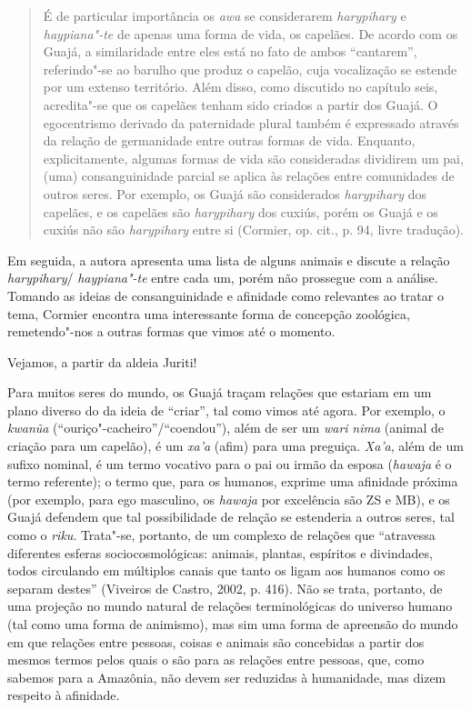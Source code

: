 \begin{quote}
É de particular importância os \emph{awa} se considerarem
\emph{harypihary} e \emph{haypiana"-te} de apenas uma forma de vida, os
capelães. De acordo com os Guajá, a similaridade entre eles está no fato
de ambos ``cantarem'', referindo"-se ao barulho que produz o capelão, cuja
vocalização se estende por um extenso território. Além disso, como
discutido no capítulo seis, acredita"-se que os capelães tenham sido
criados a partir dos Guajá. O egocentrismo derivado da paternidade
plural também é expressado através da relação de germanidade entre
outras formas de vida. Enquanto, explicitamente, algumas formas de vida
são consideradas dividirem um pai, (uma) consanguinidade parcial se
aplica às relações entre comunidades de outros seres. Por exemplo, os
Guajá são considerados \emph{harypihary} dos capelães, e os capelães são
\emph{harypihary} dos cuxiús, porém os Guajá e os cuxiús não são
\emph{harypihary} entre si (Cormier, op. cit., p. 94, livre tradução).
\end{quote}

Em seguida, a autora apresenta uma lista de alguns animais e discute a
relação \emph{harypihary}/ \emph{haypiana"-te} entre cada um, porém não
prossegue com a análise. Tomando as ideias de consanguinidade e
afinidade como relevantes ao tratar o tema, Cormier encontra uma
interessante forma de concepção zoológica, remetendo"-nos a outras formas
que vimos até o momento.

Vejamos, a partir da aldeia Juriti!

Para muitos seres do mundo, os Guajá traçam relações que estariam em um
plano diverso do da ideia de ``criar'', tal como vimos até agora. Por
exemplo, o \emph{kwanũa} (``ouriço"-cacheiro''/``coendou''), além de ser um
\emph{wari} \emph{nima} (animal de criação para um capelão), é um
\emph{xa'a} (afim) para uma preguiça. \emph{Xa'a}, além de um sufixo
nominal, é um termo vocativo para o pai ou irmão da esposa
(\emph{hawaja} é o termo referente); o termo que, para os humanos,
exprime uma afinidade próxima (por exemplo, para ego masculino, os
\emph{hawaja} por excelência são ZS e MB), e os Guajá defendem que tal
possibilidade de relação se estenderia a outros seres, tal como o
\emph{riku}. Trata"-se, portanto, de um complexo de relações que
``atravessa diferentes esferas sociocosmológicas: animais, plantas,
espíritos e divindades, todos circulando em múltiplos canais que tanto
os ligam aos humanos como os separam destes'' (Viveiros de Castro, 2002,
p. 416). Não se trata, portanto, de uma projeção no mundo natural de
relações terminológicas do universo humano (tal como uma forma de
animismo), mas sim uma forma de apreensão do mundo em que relações entre
pessoas, coisas e animais são concebidas a partir dos mesmos termos
pelos quais o são para as relações entre pessoas, que, como sabemos para
a Amazônia, não devem ser reduzidas à humanidade, mas dizem respeito à
afinidade.

